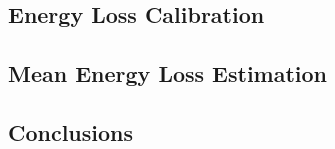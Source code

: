 \subsection{Energy Loss Calibration}

\subsection{Mean Energy Loss Estimation}

\subsection{Conclusions}
